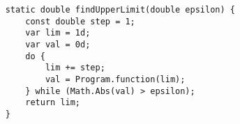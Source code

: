 \begin{lstlisting}
	static double findUpperLimit(double epsilon) {
		const double step = 1;
		var lim = 1d;
		var val = 0d;
		do {
			lim += step;
			val = Program.function(lim);
		} while (Math.Abs(val) > epsilon);
		return lim;
	}
\end{lstlisting}
